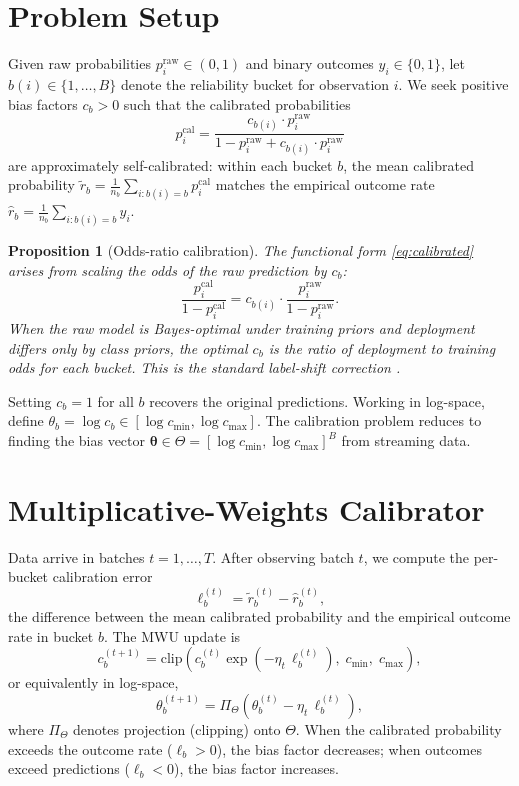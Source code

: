 \documentclass[12pt, letterpaper]{article}
\newtheorem{proposition}[theorem]{Proposition}
\theoremstyle{definition}
\theoremstyle{remark}
\begin{document}
\section{Problem Setup}
\label{sec:setup}

Given raw probabilities $p_i^{\mathrm{raw}} \in (0,1)$ and binary outcomes $y_i \in \{0,1\}$, let $b(i) \in \{1,\dots,B\}$ denote the reliability bucket for observation $i$. We seek positive bias factors $c_b > 0$ such that the calibrated probabilities
\begin{equation}
\label{eq:calibrated}
p_i^{\mathrm{cal}} = \frac{c_{b(i)} \cdot p_i^{\mathrm{raw}}}{1 - p_i^{\mathrm{raw}} + c_{b(i)} \cdot p_i^{\mathrm{raw}}}
\end{equation}
are approximately self-calibrated: within each bucket $b$, the mean calibrated probability $\tilde{r}_b = \frac{1}{n_b}\sum_{i:b(i)=b} p_i^{\mathrm{cal}}$ matches the empirical outcome rate $\hat{r}_b = \frac{1}{n_b}\sum_{i:b(i)=b} y_i$.

\begin{proposition}[Odds-ratio calibration]
\label{prop:odds}
The functional form \eqref{eq:calibrated} arises from scaling the odds of the raw prediction by $c_b$:
\[
\frac{p_i^{\mathrm{cal}}}{1-p_i^{\mathrm{cal}}} = c_{b(i)} \cdot \frac{p_i^{\mathrm{raw}}}{1-p_i^{\mathrm{raw}}}.
\]
When the raw model is Bayes-optimal under training priors and deployment differs only by class priors, the optimal $c_b$ is the ratio of deployment to training odds for each bucket. This is the standard label-shift correction \citep{saerens2002,lipton2018}.
\end{proposition}

Setting $c_b = 1$ for all $b$ recovers the original predictions. Working in log-space, define $\theta_b = \log c_b \in [\log c_{\min}, \log c_{\max}]$. The calibration problem reduces to finding the bias vector $\boldsymbol{\theta} \in \Theta = [\log c_{\min}, \log c_{\max}]^B$ from streaming data.

\section{Multiplicative-Weights Calibrator}
\label{sec:mwu}

Data arrive in batches $t = 1, \dots, T$. After observing batch $t$, we compute the per-bucket calibration error
\[
\ell_b^{(t)} = \tilde{r}_b^{(t)} - \hat{r}_b^{(t)},
\]
the difference between the mean calibrated probability and the empirical outcome rate in bucket $b$. The MWU update is
\begin{equation}
c_b^{(t+1)} = \mathrm{clip}\!\left(c_b^{(t)} \exp\!\left(-\eta_t\, \ell_b^{(t)}\right),\; c_{\min},\; c_{\max}\right),
\label{eq:mwu}
\end{equation}
or equivalently in log-space,
\begin{equation}
\theta_b^{(t+1)} = \Pi_\Theta\!\left(\theta_b^{(t)} - \eta_t\, \ell_b^{(t)}\right),
\label{eq:mwu_log}
\end{equation}
where $\Pi_\Theta$ denotes projection (clipping) onto $\Theta$. When the calibrated probability exceeds the outcome rate ($\ell_b > 0$), the bias factor decreases; when outcomes exceed predictions ($\ell_b < 0$), the bias factor increases.
\end{document}
